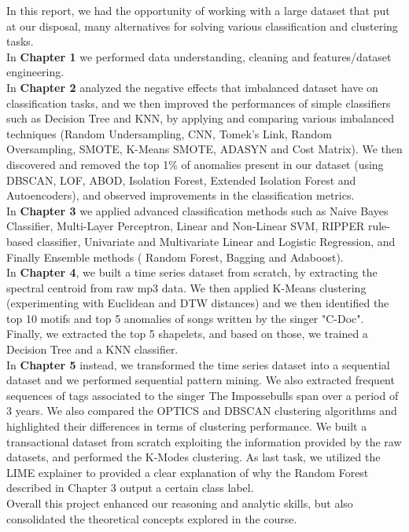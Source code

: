  
In this report, we had the opportunity of working with a large dataset that put at our disposal, many alternatives for solving various classification and clustering tasks.\\
In \textbf{Chapter 1} we performed data understanding, cleaning and features/dataset engineering.\\
In \textbf{Chapter 2} analyzed the negative effects that imbalanced dataset have on classification tasks, and we then improved the performances of simple classifiers such as Decision Tree and KNN, by applying and comparing various imbalanced techniques (Random Undersampling, CNN, Tomek's Link, Random Oversampling, SMOTE, K-Means SMOTE, ADASYN and Cost Matrix). We then discovered and removed the top 1\% of anomalies present in our dataset (using DBSCAN, LOF, ABOD, Isolation Forest, Extended Isolation Forest and Autoencoders), and observed improvements in the classification metrics.\\ In \textbf{Chapter 3} we applied advanced classification methods such as Naive Bayes Classifier, Multi-Layer Perceptron, Linear and Non-Linear SVM, RIPPER rule-based classifier, Univariate and Multivariate Linear and Logistic Regression, and Finally Ensemble methods ( Random Forest, Bagging and Adaboost). \\
In \textbf{Chapter 4}, we built a time series dataset from scratch, by extracting the spectral centroid from raw mp3 data. We then applied K-Means clustering (experimenting with Euclidean and DTW distances) and we then identified the top 10 motifs and top 5 anomalies of songs written by the singer "C-Doc".
Finally, we extracted the top 5 shapelets, and based on those, we trained a Decision Tree and a KNN classifier. \\
In \textbf{Chapter 5} instead, we transformed the time series dataset into a sequential dataset and we performed sequential pattern mining. We also extracted frequent sequences of tags associated to the singer The Impossebulls span over a period of 3 years.
We also compared the OPTICS and DBSCAN clustering algorithms and highlighted their differences in terms of clustering performance. We built a transactional dataset from scratch exploiting the information provided by the raw datasets, and performed the K-Modes clustering. 
As last task, we utilized the LIME explainer to provided a clear explanation of why the Random Forest described in Chapter 3 output a certain class label.\\
Overall this project enhanced our reasoning and analytic skills, but also consolidated the theoretical concepts explored in the course.